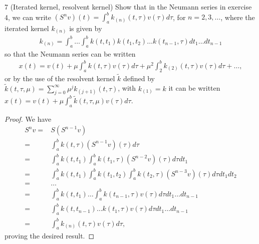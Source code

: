 \begin{exercise}{7 (Iterated kernel, resolvent kernel)}
Show that in the Neumann series in exercise 4, we can write $(S^n v)(t) = \int_a^b k_{(n)}(t, \tau) v(\tau) d\tau$, for $n = 2, 3, \dots$, where the iterated kernel $k_{(n)}$ is given by 
\begin{align*}
    k_{(n)} = \int_a^b \dots \int_a^b k(t, t_1) k(t_1, t_2) \dots k(t_{n-1}, \tau) dt_1 \dots dt_{n-1}
\end{align*}
so that the Neumann series can be written 
\begin{align*}
    x(t) = v(t) + \mu \int_a^b k(t, \tau) v(\tau) d\tau + \mu^2 \int_2^b k_{(2)}(t, \tau) v(\tau) d\tau + \dots,
\end{align*}
or by the use of the resolvent kernel $\tilde{k}$ defined by $\tilde{k}(t, \tau, \mu) = \sum_{j=0}^\infty \mu^j k_{(j+1)}(t, \tau)$, with $k_{(1)} = k$ it can be written $x(t) = v(t) + \mu \int_a^b \tilde{k}(t, \tau, \mu) v(\tau) d\tau$.
\end{exercise}
\begin{proof}
We have
\begin{align*}
    S^n v
    =& S(S^{n-1} v)\\
    =& \int_a^b k(t, \tau) (S^{n-1} v)(\tau) d\tau\\
    =& \int_a^b k(t, t_1) \int_a^b k(t_1, \tau) (S^{n-2} v)(\tau) d\tau dt_1\\
    =& \int_a^b k(t, t_1) \int_a^b k(t_1, t_2) \int_a^b k(t_2, \tau) (S^{n-3} v)(\tau) d\tau dt_1 dt_2\\
    =& \dots\\
    =& \int_a^b k(t, t_1) \dots \int_a^b k(t_{n-1}, \tau) v(\tau) d\tau dt_1 \dots dt_{n-1}\\
    =& \int_a^b k(t, t_{n-1}) \dots k(t_1, \tau) v(\tau) d\tau dt_1 \dots dt_{n-1}\\
    =& \int_a^b k_{(n)}(t, \tau) v(\tau) d\tau,
\end{align*}
proving the desired result.
\end{proof} 

